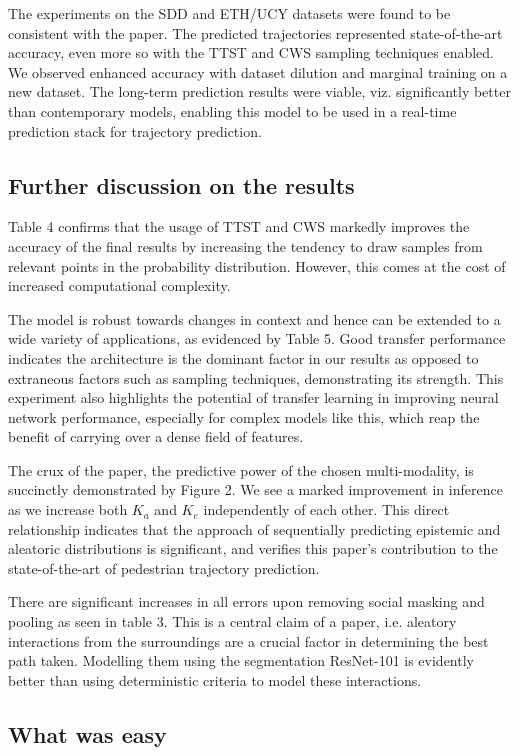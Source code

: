 The experiments on the SDD and ETH/UCY datasets were found to be consistent with the paper. The predicted trajectories represented state-of-the-art accuracy, even more so with the TTST and CWS sampling techniques enabled. We observed enhanced accuracy with dataset dilution and marginal training on a new dataset. The long-term prediction results were viable, viz. significantly better than contemporary models, enabling this model to be used in a real-time prediction stack for trajectory prediction. 

\subsection{Further discussion on the results}
Table 4 confirms that the usage of TTST and CWS markedly improves the accuracy of the final results by increasing the tendency to draw samples from relevant points in the probability distribution. However, this comes at the cost of increased computational complexity.

The model is robust towards changes in context and hence can be extended to a wide variety of applications, as evidenced by Table 5. Good transfer performance indicates the architecture is the dominant factor in our results as opposed to extraneous factors such as sampling techniques, demonstrating its strength. This experiment also highlights the potential of transfer learning in improving neural network performance, especially for complex models like this, which reap the benefit of carrying over a dense field of features.

The crux of the paper, the predictive power of the chosen multi-modality, is succinctly demonstrated by Figure 2. We see a marked improvement in inference as we increase both $K_a$ and $K_e$ independently of each other. This direct relationship indicates that the approach of sequentially predicting epistemic and aleatoric distributions is significant, and verifies this paper's contribution to the state-of-the-art of pedestrian trajectory prediction.

There are significant increases in all errors upon removing social masking and pooling as seen in table 3. This is a central claim of a paper, i.e. aleatory interactions from the surroundings are a crucial factor in determining the best path taken. Modelling them using the segmentation ResNet-101 \cite{DBLP:journals/corr/HeZRS15} is evidently better than using deterministic criteria to model these interactions.

\subsection{What was easy}

